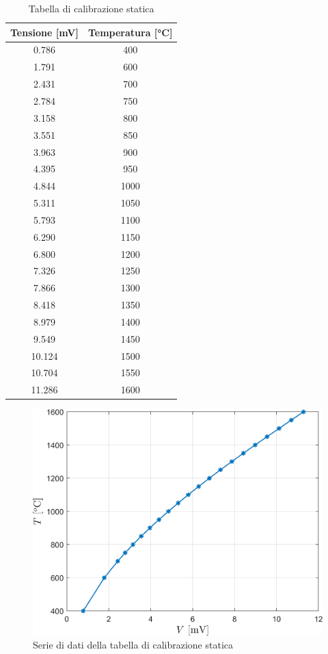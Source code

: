 \begin{table}[H]
	\centering
\begin{tabular}{c|c}
	\toprule\toprule
	\textbf{Tensione [mV]} & \textbf{Temperatura [°C]} \\ 
	\midrule\midrule
	0.786 & 400 \\ \midrule
	1.791 & 600 \\ \midrule
	2.431 & 700 \\ \midrule
	2.784 & 750 \\ \midrule
	3.158 & 800 \\ \midrule
	3.551 & 850 \\ \midrule
	3.963 & 900 \\ \midrule
	4.395 & 950 \\ \midrule
	4.844 & 1000 \\ \midrule
	5.311 & 1050 \\ \midrule
	5.793 & 1100 \\ \midrule
	6.290 & 1150 \\ \midrule
	6.800 & 1200 \\ \midrule
	7.326 & 1250 \\ \midrule
	7.866 & 1300 \\ \midrule
	8.418 & 1350 \\ \midrule
	8.979 & 1400 \\ \midrule
	9.549 & 1450 \\ \midrule
	10.124 & 1500 \\ \midrule
	10.704 & 1550 \\ \midrule
	11.286 & 1600 \\ 
	\bottomrule\bottomrule
\end{tabular}
\caption{Tabella di calibrazione statica}
\label{tab:calibrazione statica}
\end{table}
\begin{figure}
	\centering
	\includegraphics[width=0.7\linewidth]{"../sperimentazione nei propulsori/calibration"}
	\caption{Serie di dati della tabella di calibrazione statica}
\label{fig:serie-calibrazione}
\end{figure}



